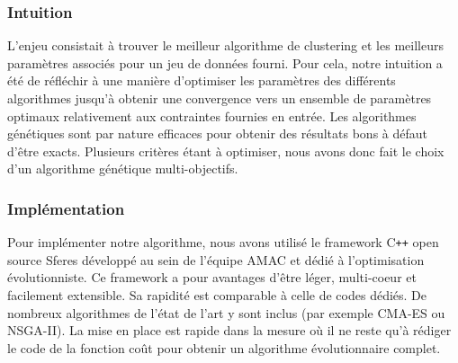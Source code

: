 \documentclass[draft]{llncs}
\begin{document}






\subsubsection{Intuition}

L'enjeu consistait à trouver le meilleur algorithme de clustering et les meilleurs paramètres associés pour un jeu de données fourni.
Pour cela, notre intuition a été de réfléchir à une manière d'optimiser les paramètres des différents algorithmes jusqu'à obtenir une convergence vers un ensemble de paramètres optimaux relativement aux contraintes fournies en entrée.
Les algorithmes génétiques sont par nature efficaces pour obtenir des résultats bons à défaut d'être exacts.
Plusieurs critères étant à optimiser, nous avons donc fait le choix d'un algorithme génétique multi-objectifs.


\subsubsection{Implémentation}

Pour implémenter notre algorithme, nous avons utilisé le framework C{}\verb!++! open source Sferes \cite{Mouret2010} développé au sein de l'équipe AMAC et dédié à l'optimisation évolutionniste.
Ce framework a pour avantages d'être léger, multi-coeur et facilement extensible.
Sa rapidité est comparable à celle de codes dédiés.
De nombreux algorithmes de l'état de l'art y sont inclus (par exemple CMA-ES ou NSGA-II).
La mise en place est rapide dans la mesure où il ne reste qu'à rédiger le code de la fonction coût pour obtenir un algorithme évolutionnaire complet.
\end{document}
